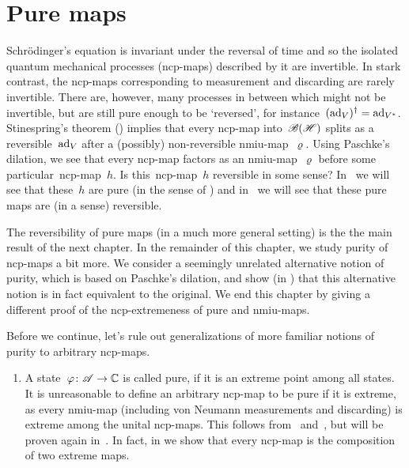 \documentclass[b]{subfiles}
\begin{document}
\section{Pure maps}
\begin{parsec}%
\begin{point}%
Schr\"odinger's equation is invariant under the reversal of time
    and so the isolated quantum mechanical processes (ncp-maps) described by
    it are invertible.
In stark contrast, the ncp-maps corresponding to measurement and discarding
    are rarely invertible.
There are, however, many  processes in between
    which might not be invertible, but are still pure enough to be `reversed',
    for instance~$(\mathrm{ad}_V)^\dagger = \mathrm{ad}_{V^*}$.
    Stinespring's theorem () implies that every ncp-map into~$\mathscr{B}(\mathscr{H})$
    splits as a reversible~$\mathrm{ad}_V$ after a (possibly) non-reversible
    nmiu-map~$\varrho$.
Using Paschke's dilation,
    we see that every ncp-map factors
    as an nmiu-map~$\varrho$ before some particular~ncp-map~$h$.
Is this~ncp-map~$h$ reversible in some sense?
In~ we will see that these~$h$
    are pure (in the sense of )
    and in~
    we will see that these pure maps are (in a sense) reversible.
\begin{point}%
The reversibility of pure maps (in a much more general setting)
    is the the main result of the next chapter.
In the remainder of this chapter, we study purity of ncp-maps a bit more.
We consider a seemingly unrelated  alternative notion of purity,
    which is based on Paschke's dilation,
    and show (in )
    that this alternative notion is in fact equivalent to the original.
We end this chapter by giving a different proof
    of the ncp-extremeness of pure and nmiu-maps.
\end{point}
\begin{point}%
Before we continue, let's rule out generalizations
    of more familiar notions of purity
    to arbitrary ncp-maps.
\begin{enumerate}
\item
A state~$\varphi\colon \mathscr{A} \to \mathbb{C}$ is called pure, if it is an extreme
    point among all states.
It is unreasonable to define an arbitrary ncp-map to be pure
    if it is extreme, as every nmiu-map (including 
    von Neumann measurements and discarding)
    is extreme among the unital ncp-maps.
This follows from~ and~,
    but will be proven again in~.
In fact, in 
    we show that every ncp-map is the composition
    of two extreme maps.


\end{enumerate}
\end{point}
\end{point}
\end{parsec}
\end{document}
